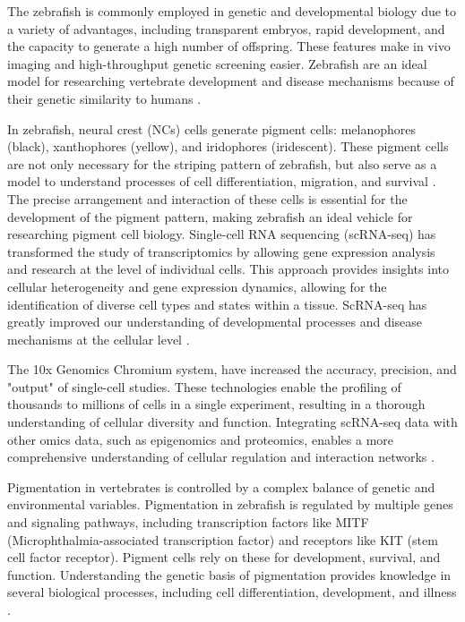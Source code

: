 \documentclass[runningheads]{llncs}
\begin{document}
The zebrafish is commonly employed in genetic and developmental biology due to a variety of advantages, including transparent embryos, rapid development, and the capacity to generate a high number of offspring. These features make in vivo imaging and high-throughput genetic screening easier. Zebrafish are an ideal model for researching vertebrate development and disease mechanisms because of their genetic similarity to humans \cite{howard2021atlas,patterson2019zebrafish}.

In zebrafish, neural crest (NCs) cells generate pigment cells: melanophores (black), xanthophores (yellow), and iridophores (iridescent). 
These pigment cells are not only necessary for the striping pattern of zebrafish, but also serve as a model to understand processes of cell differentiation, migration, and survival \cite{patterson2019zebrafish}. 
The precise arrangement and interaction of these cells is essential for the development of the pigment pattern, making zebrafish an ideal vehicle for researching pigment cell biology. Single-cell RNA sequencing (scRNA-seq) has transformed the study of transcriptomics by allowing gene expression analysis and research at the level of individual cells. This approach provides insights into cellular heterogeneity and gene expression dynamics, allowing for the identification of diverse cell types and states within a tissue. ScRNA-seq has greatly improved our understanding of developmental processes and disease mechanisms at the cellular level \cite{nayak2021hitchhiker}.

The 10x Genomics Chromium system, have increased the accuracy, precision, and "output" of single-cell studies.
These technologies enable the profiling of thousands to millions of cells in a single experiment, resulting in a thorough understanding of cellular diversity and function. Integrating scRNA-seq data with other omics data, such as epigenomics and proteomics, enables a more comprehensive understanding of cellular regulation and interaction networks \cite{stuart2019comprehensive}.

Pigmentation in vertebrates is controlled by a complex balance of genetic and environmental variables. Pigmentation in zebrafish is regulated by multiple genes and signaling pathways, including transcription factors like MITF (Microphthalmia-associated transcription factor) and receptors like KIT (stem cell factor receptor). Pigment cells rely on these for development, survival, and function. Understanding the genetic basis of pigmentation provides knowledge in several biological processes, including cell differentiation, development, and illness \cite{kenny2022tfap2}.
\end{document}
